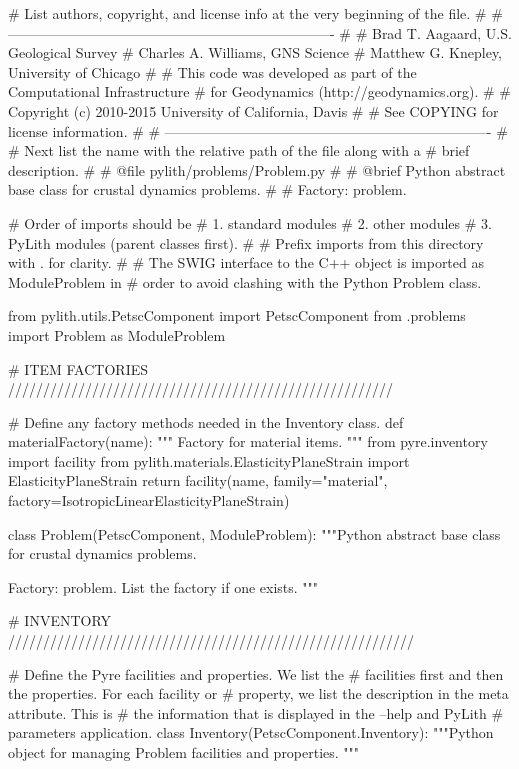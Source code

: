 \begin{python}
# List authors, copyright, and license info at the very beginning of the file.
#
# ----------------------------------------------------------------------
#
# Brad T. Aagaard, U.S. Geological Survey
# Charles A. Williams, GNS Science
# Matthew G. Knepley, University of Chicago
#
# This code was developed as part of the Computational Infrastructure
# for Geodynamics (http://geodynamics.org).
#
# Copyright (c) 2010-2015 University of California, Davis
#
# See COPYING for license information.
#
# ----------------------------------------------------------------------
# 
# Next list the name with the relative path of the file along with a
# brief description.
#  
# @file pylith/problems/Problem.py
#
# @brief Python abstract base class for crustal dynamics problems.
#
# Factory: problem.

# Order of imports should be
# 1. standard modules
# 2. other modules
# 3. PyLith modules (parent classes first).
#
# Prefix imports from this directory with . for clarity.
#  
# The SWIG interface to the C++ object is imported as ModuleProblem in
# order to avoid clashing with the Python Problem class.

from pylith.utils.PetscComponent import PetscComponent
from .problems import Problem as ModuleProblem

# ITEM FACTORIES ///////////////////////////////////////////////////////

# Define any factory methods needed in the Inventory class.
def materialFactory(name):
    """
    Factory for material items.
    """
    from pyre.inventory import facility
    from pylith.materials.ElasticityPlaneStrain import ElasticityPlaneStrain
    return facility(name, family="material", factory=IsotropicLinearElasticityPlaneStrain)

class Problem(PetscComponent, ModuleProblem):
    """Python abstract base class for crustal dynamics problems.

    Factory: problem. List the factory if one exists.
    """

    # INVENTORY //////////////////////////////////////////////////////////

    # Define the Pyre facilities and properties. We list the
    # facilities first and then the properties. For each facility or
    # property, we list the description in the meta attribute. This is
    # the information that is displayed in the --help and PyLith
    # parameters application.
    class Inventory(PetscComponent.Inventory):
        """Python object for managing Problem facilities and properties.
        """


\end{python}
